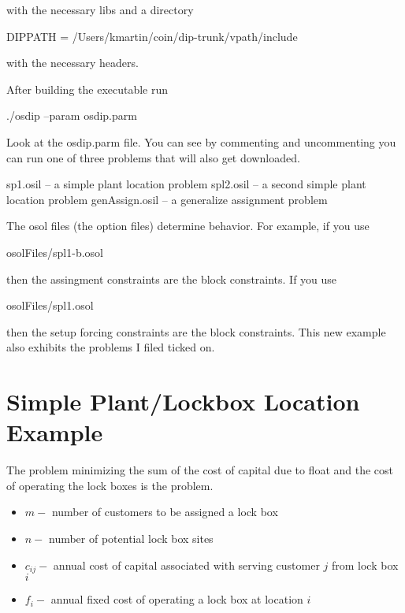 \documentclass[11pt]{article}
\renewcommand{\_}{{\char"5F}}
\renewcommand{\{}{{\char"7B}}
\renewcommand{\}}{{\char"7D}}
\renewcommand{\^}{{\char"0D}}
\renewcommand{\'}{{\char"0D}}
\begin{document}
with the necessary libs and a directory

DIPPATH = /Users/kmartin/coin/dip-trunk/vpath/include

with the necessary headers.

After building the executable run

./osdip --param osdip.parm

Look at the osdip.parm file. You can see by commenting and uncommenting you can
run one of three problems that will also get downloaded.

sp1.osil -- a simple plant location problem spl2.osil -- a second simple plant
location problem genAssign.osil -- a generalize assignment problem

The osol files (the option files) determine behavior. For example, if you use

osolFiles/spl1-b.osol

then the assingment constraints are the block constraints. If you use

osolFiles/spl1.osol

then the setup forcing constraints are the block constraints.  This  new  example
also exhibits the problems I filed ticked on.



\section{Simple Plant/Lockbox Location Example}


 The problem minimizing
the sum of the cost of capital due to float  and the cost of operating the lock boxes is the
 problem.  

\begin{itemize}
\item[]  $m -$ number of customers to be assigned a lock box

\item[]  $n -$ number of potential lock box sites

\item[]  $c_{ij} -$ annual cost of capital associated with serving customer $j$ from lock box $i$ 

\item[]  $f_{i} -$  annual fixed cost of operating a lock box at location $i$
\end{itemize}
\end{document}
